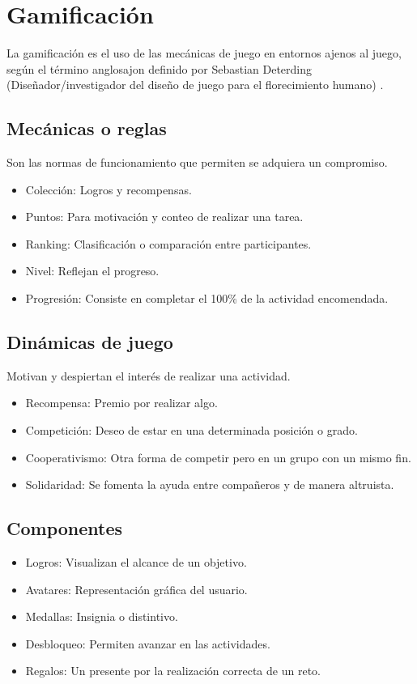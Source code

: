 \section{Gamificación}
La gamificación es el uso de las mecánicas de juego en entornos ajenos al juego, según el término anglosajon definido por Sebastian Deterding (Diseñador/investigador del diseño de juego para el florecimiento humano) \cite{gameDef}. 

\subsection{Mecánicas o reglas}\cite{gameficacion}
Son las normas de funcionamiento que permiten se adquiera un compromiso.
\begin{itemize}
	\item Colección: Logros y recompensas.
	\item Puntos: Para motivación y conteo de realizar una tarea.
	\item Ranking: Clasificación o comparación entre participantes.
	\item Nivel: Reflejan el progreso.
	\item Progresión: Consiste en completar el 100\% de la actividad encomendada.	
\end{itemize}

\subsection{Dinámicas de juego}\cite{gameficacion}
Motivan y despiertan el interés de realizar una actividad.
\begin{itemize}
	\item Recompensa: Premio por realizar algo.
	\item Competición: Deseo de estar en una determinada posición o grado.
	\item Cooperativismo: Otra forma de competir pero en un grupo con un mismo fin.
	\item Solidaridad: Se fomenta la ayuda entre compañeros y de manera altruista.
\end{itemize}

\subsection{Componentes}\cite{gameficacion}
\begin{itemize}
	\item Logros: Visualizan el alcance de un objetivo.
	\item Avatares: Representación gráfica del usuario.
	\item Medallas: Insignia o distintivo.
	\item Desbloqueo: Permiten avanzar en las actividades.
	\item Regalos: Un presente por la realización correcta de un reto.
\end{itemize}

